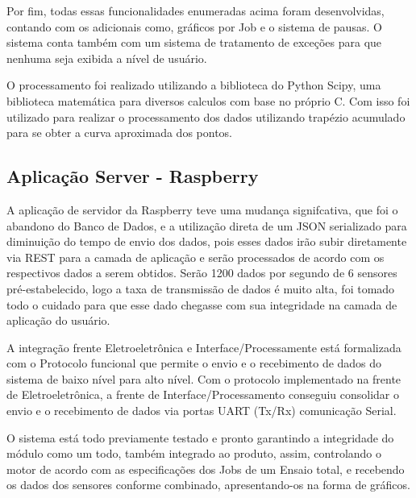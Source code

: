 Por fim, todas essas funcionalidades enumeradas acima foram desenvolvidas, contando com os adicionais como, gráficos por Job e o sistema de pausas. O sistema conta também com um sistema de tratamento de exceções para que nenhuma seja exibida a nível de usuário.

O processamento foi realizado utilizando a biblioteca do Python Scipy, uma biblioteca matemática para diversos calculos com base no próprio C. Com isso foi utilizado para realizar o processamento dos dados utilizando trapézio acumulado para se obter a curva aproximada dos pontos.

\subsection{Aplicação Server - Raspberry}

A aplicação de servidor da Raspberry teve uma mudança signifcativa, que foi o abandono do Banco de Dados, e a utilização direta de um JSON serializado para diminuição do tempo de envio dos dados, pois esses dados irão subir diretamente via REST para a camada de aplicação e serão processados de acordo com os respectivos dados a serem obtidos. Serão 1200 dados por segundo de 6 sensores pré-estabelecido, logo a taxa de transmissão de dados é muito alta, foi tomado todo o cuidado para que esse dado chegasse com sua integridade na camada de aplicação do usuário.

A integração frente Eletroeletrônica e Interface/Processamente está formalizada com o Protocolo funcional que permite o envio e o recebimento de dados do sistema de baixo nível para alto nível. Com o protocolo implementado na frente de Eletroeletrônica, a frente de Interface/Processamento conseguiu consolidar o envio e o recebimento de dados via portas UART (Tx/Rx) comunicação Serial.

O sistema está todo previamente testado e pronto garantindo a integridade do módulo como um todo, também integrado ao produto, assim, controlando o motor de acordo com as especificações dos Jobs de um Ensaio total, e recebendo os dados dos sensores conforme combinado, apresentando-os na forma de gráficos.



